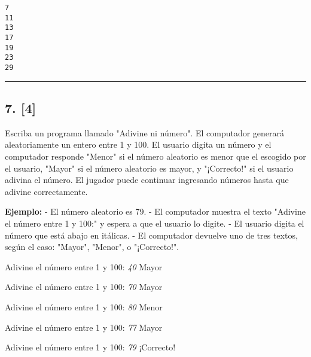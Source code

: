\documentclass[11pt]{article}
\begin{document}
    \begin{Verbatim}[commandchars=\\\{\}]
7
11
13
17
19
23
29

    \end{Verbatim}

    \begin{center}\rule{0.5\linewidth}{\linethickness}\end{center}

    \subsection{7. {[}4{]}}\label{section}

Escriba un programa llamado "Adivine ni número". El computador generará
aleatoriamente un entero entre 1 y 100. El usuario digita un número y el
computador responde "Menor" si el número aleatorio es menor que el
escogido por el usuario, "Mayor" si el número aleatorio es mayor, y
"¡Correcto!" si el usuario adivina el número. El jugador puede continuar
ingresando números hasta que adivine correctamente.

\textbf{Ejemplo:} - El número aleatorio es 79. - El computador muestra
el texto "Adivine el número entre 1 y 100:" y espera a que el usuario lo
digite. - El usuario digita el número que está abajo en itálicas. - El
computador devuelve uno de tres textos, según el caso: "Mayor", "Menor",
o "¡Correcto!".

    Adivine el número entre 1 y 100: \emph{40} Mayor

Adivine el número entre 1 y 100: \emph{70} Mayor

Adivine el número entre 1 y 100: \emph{80} Menor

Adivine el número entre 1 y 100: \emph{77} Mayor

Adivine el número entre 1 y 100: \emph{79} ¡Correcto!
\end{document}

